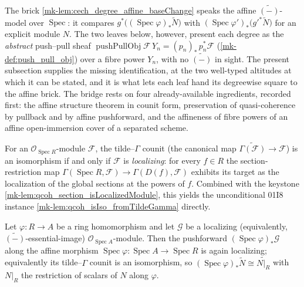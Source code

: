 The brick \ref{mk-lem:cech_degree_affine_baseChange} speaks the affine
\(\widetilde{(-)}\)-model over \(\operatorname{Spec}\): it compares
\(g^*\bigl((\operatorname{Spec}\varphi)_*\widetilde{N}\bigr)\) with
\((\operatorname{Spec}\varphi')_*\bigl(g'^*\widetilde{N}\bigr)\) for an explicit module
\(N\). The two leaves below, however, present each degree as the \emph{abstract}
push--pull sheaf \(\operatorname{pushPullObj} \mathcal{F}\, Y_n = (p_n)_*\,p_n^*\mathcal{F}\)
(\ref{mk-def:push_pull_obj}) over a fibre power \(Y_n\), with no \(\widetilde{(-)}\) in
sight. The present subsection supplies the missing identification, at the two well-typed
altitudes at which it can be stated, and it is what lets each leaf hand its degreewise
square to the affine brick. The bridge rests on four already-available ingredients,
recorded first: the affine structure theorem in counit form, preservation of
quasi-coherence by pullback and by affine pushforward, and the affineness of fibre powers
of an affine open-immersion cover of a separated scheme.

\begin{lemma}
  \label{mk-lem:isIso_fromTildeGamma_iff_isLocalizing_mathlib}
  \mathlibok

  For an \(\mathcal{O}_{\operatorname{Spec} R}\)-module \(\mathcal{F}\), the tilde--\(\Gamma\)
  counit (the canonical map \(\widetilde{\Gamma(\mathcal{F})} \to \mathcal{F}\)) is an
  isomorphism if and only if \(\mathcal{F}\) is \emph{localizing}: for every \(f \in R\)
  the section-restriction map
  \(\Gamma(\operatorname{Spec} R, \mathcal{F}) \to \Gamma(D(f), \mathcal{F})\) exhibits its
  target as the localization of the global sections at the powers of \(f\). Combined with
  the keystone \ref{mk-lem:qcoh_section_isLocalizedModule}, this yields the unconditional
  01I8 instance \ref{mk-lem:qcoh_isIso_fromTildeGamma} directly.
\end{lemma}

\begin{lemma}
  \label{mk-lem:isLocalizing_pushforward_mathlib}
  \mathlibok

  Let \(\varphi : R \to A\) be a ring homomorphism and let \(\mathcal{G}\) be a localizing
  (equivalently, \(\widetilde{(-)}\)-essential-image) \(\mathcal{O}_{\operatorname{Spec} A}\)-module.
  Then the pushforward \((\operatorname{Spec}\varphi)_*\mathcal{G}\) along the affine
  morphism \(\operatorname{Spec}\varphi : \operatorname{Spec} A \to \operatorname{Spec} R\)
  is again localizing; equivalently its tilde--\(\Gamma\) counit is an isomorphism, so
  \((\operatorname{Spec}\varphi)_*\widetilde{N} \cong \widetilde{N|_R}\) with \(N|_R\) the
  restriction of scalars of \(N\) along \(\varphi\).
\end{lemma}

